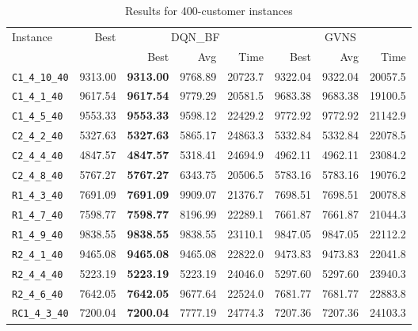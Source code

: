 \begin{table}[ht]
\centering
\small
\setlength{\tabcolsep}{5pt}
\caption{Results for 400-customer instances}
\vspace{4mm}
\begin{adjustbox}{width=\textwidth}
\begin{tabular}{l r r r r @{\hspace{8pt}} r r r @{\hspace{8pt}}}
\toprule
\multirow{2}{*}{Instance} & \multirow{2}{*}{Best} & \multicolumn{3}{c}{DQN\_BF} & \multicolumn{3}{c}{GVNS} \\
\cmidrule(lr){3-5} \cmidrule(lr){6-8}
 &  & Best & Avg & Time & Best & Avg & Time \\
\midrule
\texttt{C1\_4\_10\_40} & 9313.00 & \textbf{9313.00} & 9768.89 & 20723.7 & 9322.04 & 9322.04 & 20057.5 \\
\texttt{C1\_4\_1\_40} & 9617.54 & \textbf{9617.54} & 9779.29 & 20581.5 & 9683.38 & 9683.38 & 19100.5 \\
\texttt{C1\_4\_5\_40} & 9553.33 & \textbf{9553.33} & 9598.12 & 22429.2 & 9772.92 & 9772.92 & 21142.9 \\
\texttt{C2\_4\_2\_40} & 5327.63 & \textbf{5327.63} & 5865.17 & 24863.3 & 5332.84 & 5332.84 & 22078.5 \\
\texttt{C2\_4\_4\_40} & 4847.57 & \textbf{4847.57} & 5318.41 & 24694.9 & 4962.11 & 4962.11 & 23084.2 \\
\texttt{C2\_4\_8\_40} & 5767.27 & \textbf{5767.27} & 6343.75 & 20506.5 & 5783.16 & 5783.16 & 19076.2 \\
\texttt{R1\_4\_3\_40} & 7691.09 & \textbf{7691.09} & 9909.07 & 21376.7 & 7698.51 & 7698.51 & 20078.8 \\
\texttt{R1\_4\_7\_40} & 7598.77 & \textbf{7598.77} & 8196.99 & 22289.1 & 7661.87 & 7661.87 & 21044.3 \\
\texttt{R1\_4\_9\_40} & 9838.55 & \textbf{9838.55} & 9838.55 & 23110.1 & 9847.05 & 9847.05 & 22112.2 \\
\texttt{R2\_4\_1\_40} & 9465.08 & \textbf{9465.08} & 9465.08 & 22822.0 & 9473.83 & 9473.83 & 22041.8 \\
\texttt{R2\_4\_4\_40} & 5223.19 & \textbf{5223.19} & 5223.19 & 24046.0 & 5297.60 & 5297.60 & 23940.3 \\
\texttt{R2\_4\_6\_40} & 7642.05 & \textbf{7642.05} & 9677.64 & 22524.0 & 7681.77 & 7681.77 & 22883.8 \\
\texttt{RC1\_4\_3\_40} & 7200.04 & \textbf{7200.04} & 7777.19 & 24774.3 & 7207.36 & 7207.36 & 24103.3 \\

\end{tabular}
\end{adjustbox}
\end{table}
